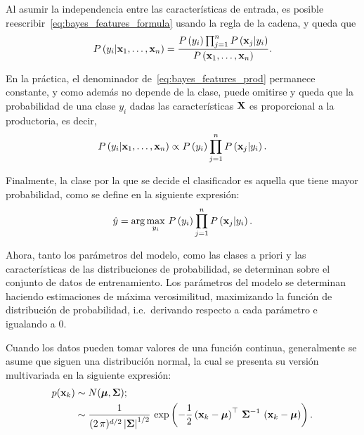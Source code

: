 Al asumir la independencia entre las características de entrada, es posible reescribir~\eqref{eq:bayes_features_formula} usando la regla de la cadena, y queda que
%
\begin{equation}
    \label{eq:bayes_features_prod}
    P\left(y_i | \vect{x}_1, \dots, \vect{x}_n\right) =
    \frac{P\left(y_i\right) \prod_{j = 1}^n P\left(\vect{x}_j | y_i\right)}
    {P\left(\vect{x}_1, \dots, \vect{x}_n\right)}.
\end{equation}

En la práctica, el denominador de~\eqref{eq:bayes_features_prod} permanece constante, y como además no depende de la clase, puede omitirse y queda que la probabilidad de una clase $y_i$ dadas las características $\mathrm{\mathbf{X}}$ es proporcional a la productoria, es decir,
%
\begin{equation}
    \label{eq:bayes_prop_prod}
    P\left(y_i | \vect{x}_1, \dots, \vect{x}_n\right) \propto
    P\left(y_i\right) \prod_{j = 1}^n P\left(\vect{x}_j | y_i\right).
\end{equation}

Finalmente, la clase por la que se decide el clasificador es aquella que tiene mayor probabilidad, como se define en la siguiente expresión:
%
\begin{equation}
    \label{eq:bayes_clasifier}
    \hat{y} = \arg\max_{y_i} \, P\left(y_i\right) \prod_{j = 1}^n P\left(\vect{x}_j | y_i\right).
\end{equation}

Ahora, tanto los parámetros del modelo, como las clases a priori y las características de las distribuciones de probabilidad, se determinan sobre el conjunto de datos de entrenamiento.
Los parámetros del modelo se determinan haciendo estimaciones de máxima verosimilitud, maximizando la función de distribución de probabilidad, i.e.\ derivando respecto a cada parámetro e igualando a $0$.

Cuando los datos pueden tomar valores de una función continua, generalmente se asume que siguen una distribución normal, la cual se presenta su versión multivariada en la siguiente expresión:
%
\begin{align}
    p(\vect{x}_k) &\sim N(\boldsymbol{\mu}, \boldsymbol{\Sigma}); \nonumber \\
    &\sim \frac{1}{(2\,\pi)^{d/2}\left|\boldsymbol{\Sigma}\right|^{1/2}}\,
    \exp\left(-\frac{1}{2}\left(\vect{x}_k - \boldsymbol{\mu}\right)^\top\,
    \boldsymbol{\Sigma}^{-1}\,\left(\vect{x}_k - \boldsymbol{\mu}\right)\right). \label{eq:gaussian_bayes}
\end{align}


